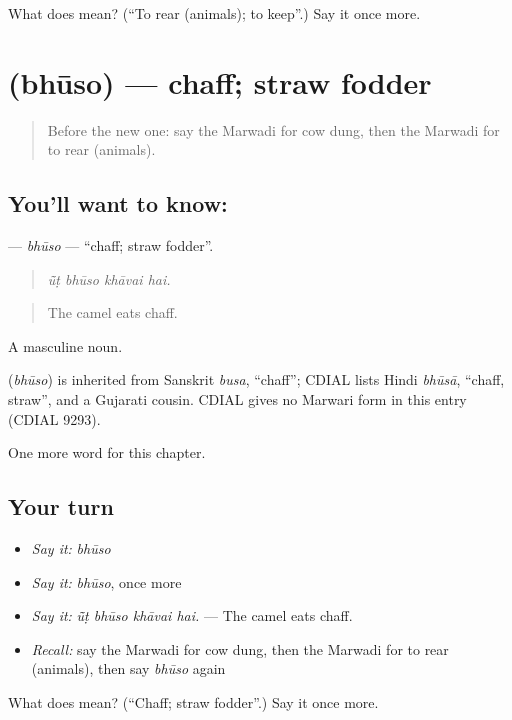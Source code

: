 \begin{tcolorbox}[breakable,colback=teal!4,colframe=teal!35!black,title={Before you move on}]
What does  mean? (\textquotedblleft{}To rear (animals); to keep\textquotedblright{}.) Say it once more.
\end{tcolorbox}
\section[\texorpdfstring{\mw{भूसो} (bhūso)}{भूसो (bhūso)}]{ (bhūso) — chaff; straw fodder}

\label{lesson:MW-C235-bhuso}



\begin{quote}
Before the new one: say the Marwadi for cow dung, then the Marwadi for to rear (animals).
\end{quote}

\subsection*{You'll want to know: }
\textbf{} — \emph{bhūso} — \textquotedblleft{}chaff; straw fodder\textquotedblright{}.

\begin{quote}
   
\end{quote}

\begin{quote}
\emph{ū̃ṭ bhūso khāvai hai.}
\end{quote}

\begin{quote}
The camel eats chaff.
\end{quote}

A masculine noun.

\begin{cousinweb}
\textbf{} (\emph{bhūso}) is inherited from Sanskrit \emph{busa}, \textquotedblleft{}chaff\textquotedblright{}; CDIAL lists Hindi \emph{bhūsā}, \textquotedblleft{}chaff, straw\textquotedblright{}, and a Gujarati cousin. CDIAL gives no Marwari form in this entry (CDIAL 9293).
\end{cousinweb}

\begin{grammarlens}[title={What you've built}]
One more word for this chapter.
\end{grammarlens}

\subsection*{Your turn}
\begin{itemize}
\raggedright
  \item \emph{Say it:} \emph{bhūso}
  \item \emph{Say it:} \emph{bhūso}, once more
  \item \emph{Say it:} \emph{ū̃ṭ bhūso khāvai hai.} — The camel eats chaff.
  \item \emph{Recall:} say the Marwadi for cow dung, then the Marwadi for to rear (animals), then say \emph{bhūso} again
\end{itemize}

\begin{tcolorbox}[breakable,colback=teal!4,colframe=teal!35!black,title={Before you move on}]
What does  mean? (\textquotedblleft{}Chaff; straw fodder\textquotedblright{}.) Say it once more.
\end{tcolorbox}
